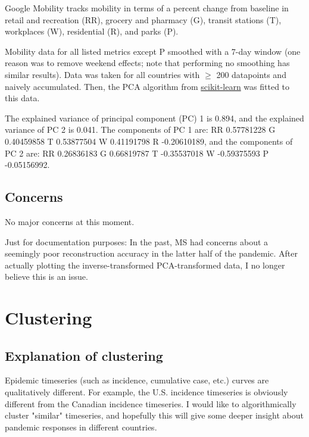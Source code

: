 \documentclass{article}
\begin{document}
Google Mobility tracks mobility in terms of a percent change from baseline in retail and recreation (RR), grocery and pharmacy (G), transit stations (T), workplaces (W), residential (R), and parks (P).

Mobility data for all listed metrics except P smoothed with a 7-day window (one reason was to remove weekend effects; note that performing no smoothing has similar results). Data was taken for all countries with $\geq$ 200 datapoints and naively accumulated. Then, the PCA algorithm from \href{https://scikit-learn.org/stable/}{scikit-learn} was fitted to this data. 

The explained variance of principal component (PC) 1 is 0.894, and the explained variance of PC 2 is 0.041. The components of PC 1 are: RR 0.57781228  G 0.40459858 T 0.53877504  W 0.41191798 R -0.20610189, and the components of PC 2 are: RR 0.26836183  G 0.66819787 T -0.35537018 W -0.59375593 P -0.05156992.

\subsection{Concerns}
No major concerns at this moment. 

Just for documentation purposes: In the past, MS had concerns about a seemingly poor reconstruction accuracy in the latter half of the pandemic. After actually plotting the inverse-transformed PCA-transformed data, I no longer believe this is an issue.


\section{Clustering}
\subsection{Explanation of clustering}
Epidemic timeseries (such as incidence, cumulative case, etc.) curves are qualitatively different. For example, the U.S. incidence timeseries is obviously different from the Canadian incidence timeseries. I would like to algorithmically cluster "similar" timeseries, and hopefully this will give some deeper insight about pandemic responses in different countries. 
\end{document}

